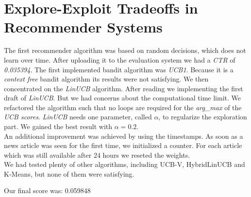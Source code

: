 \documentclass[a4paper, 11pt]{article}
\begin{document}
\section{Explore-Exploit Tradeoffs in Recommender Systems}
The first recommender algorithm was based on random decisions, which does not learn over time. After uploading it to the evaluation system we had a \emph{CTR} of \emph{0.035394}. The first implemented bandit algorithm was \emph{UCB1}. Because it is a \emph{context free} bandit algorithm its results were not satisfying. 
We then concentrated on the \emph{LinUCB} algorithm. After reading \cite{LinUCB} we implementing the first draft of \emph{LinUCB}. But we had concerns about the computational time limit. We refactored the algorithm such that no loops are required for the \emph{arg\_max} of the \emph{UCB scores}. \emph{LinUCB} needs one parameter, called $\alpha$, to regularize the exploration part. We gained the best result with $\alpha=0.2$.\\

An additional improvement was achieved by using the timestamps. As soon as a news article was seen for the first time, we initialized a counter. For each article which was still available after 24 hours we reseted the weights.\\

We had tested plenty of other algorithms, including UCB-V, HybridLinUCB and K-Means, but none of them were satisfying.

Our final score was: 0.059848


\small{}
\end{document}
